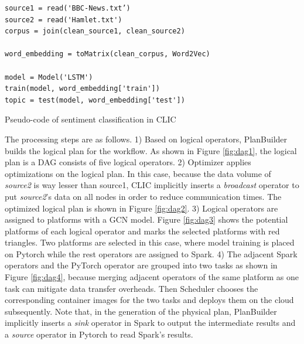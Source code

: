 \begin{listing}[ht]
\begin{verbatim}
source1 = read('BBC-News.txt’)
source2 = read('Hamlet.txt')
corpus = join(clean_source1, clean_source2)

word_embedding = toMatrix(clean_corpus, Word2Vec)
    
model = Model('LSTM')
train(model, word_embedding['train'])
topic = test(model, word_embedding['test'])
\end{verbatim}
\caption{Pseudo-code of sentiment classification in CLIC}
\label{code:workflow}
\end{listing}
The processing steps are as follows. 1) Based on logical operators, PlanBuilder builds the logical plan for the workflow. As shown in Figure \ref{fig:dag1}, the logical plan is a  DAG consists of five logical operators. 2) Optimizer applies optimizations on the logical plan. In this case, because the data volume of \textit{source2} is way lesser than source1, CLIC implicitly inserts a \textit{broadcast} operator to put \textit{source2}’s data on all nodes in order to reduce communication times. The optimized logical plan is shown in Figure \ref{fig:dag2}. 3) Logical operators are assigned to platforms with a GCN model. Figure \ref{fig:dag3} shows the potential platforms of each logical operator and marks the selected platforms with red triangles. Two platforms are selected in this case, where model training is placed on Pytorch while the rest operators are assigned to Spark. 4) The adjacent Spark operators and the PyTorch operator are grouped into two tasks as shown in Figure \ref{fig:dag4}, because merging adjacent operators of the same platform as one task can mitigate data transfer overheads. Then Scheduler chooses the corresponding container images for the two tasks and deploys them on the cloud subsequently. Note that, in the generation of the physical plan, PlanBuilder implicitly inserts a \textit{sink} operator in Spark to output the intermediate results and a \textit{source} operator in Pytorch to read Spark’s results.
